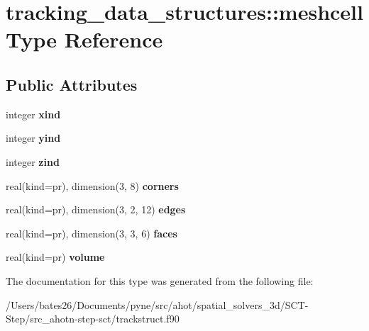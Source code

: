 \hypertarget{structtracking__data__structures_1_1meshcell}{\section{tracking\+\_\+data\+\_\+structures\+:\+:meshcell Type Reference}
\label{structtracking__data__structures_1_1meshcell}
}
\subsection*{Public Attributes}
\begin{DoxyCompactItemize}
\item 
\hypertarget{structtracking__data__structures_1_1meshcell_afd4a41c0924cdfa672043dff98383247}{integer {\bfseries xind}}\label{structtracking__data__structures_1_1meshcell_afd4a41c0924cdfa672043dff98383247}

\item 
\hypertarget{structtracking__data__structures_1_1meshcell_aaf221593bf60310472dfdcc78d6c2e79}{integer {\bfseries yind}}\label{structtracking__data__structures_1_1meshcell_aaf221593bf60310472dfdcc78d6c2e79}

\item 
\hypertarget{structtracking__data__structures_1_1meshcell_ae19a4af32e3f12bfa8042da05505aa6e}{integer {\bfseries zind}}\label{structtracking__data__structures_1_1meshcell_ae19a4af32e3f12bfa8042da05505aa6e}

\item 
\hypertarget{structtracking__data__structures_1_1meshcell_a13fcf4021ce5a5d1579ffbff38aaf33d}{real(kind=pr), dimension(3, 8) {\bfseries corners}}\label{structtracking__data__structures_1_1meshcell_a13fcf4021ce5a5d1579ffbff38aaf33d}

\item 
\hypertarget{structtracking__data__structures_1_1meshcell_a4edd8593d1bb0badbc5d723780d2c6c5}{real(kind=pr), dimension(3, 2, 12) {\bfseries edges}}\label{structtracking__data__structures_1_1meshcell_a4edd8593d1bb0badbc5d723780d2c6c5}

\item 
\hypertarget{structtracking__data__structures_1_1meshcell_a8b0a596007ab35b13961d9037d7b6e44}{real(kind=pr), dimension(3, 3, 6) {\bfseries faces}}\label{structtracking__data__structures_1_1meshcell_a8b0a596007ab35b13961d9037d7b6e44}

\item 
\hypertarget{structtracking__data__structures_1_1meshcell_a1a08090e934eae80b9b27f55c4ccaa00}{real(kind=pr) {\bfseries volume}}\label{structtracking__data__structures_1_1meshcell_a1a08090e934eae80b9b27f55c4ccaa00}

\end{DoxyCompactItemize}


The documentation for this type was generated from the following file\+:\begin{DoxyCompactItemize}
\item 
/\+Users/bates26/\+Documents/pyne/src/ahot/spatial\+\_\+solvers\+\_\+3d/\+S\+C\+T-\/\+Step/src\+\_\+ahotn-\/step-\/sct/trackstruct.\+f90\end{DoxyCompactItemize}
